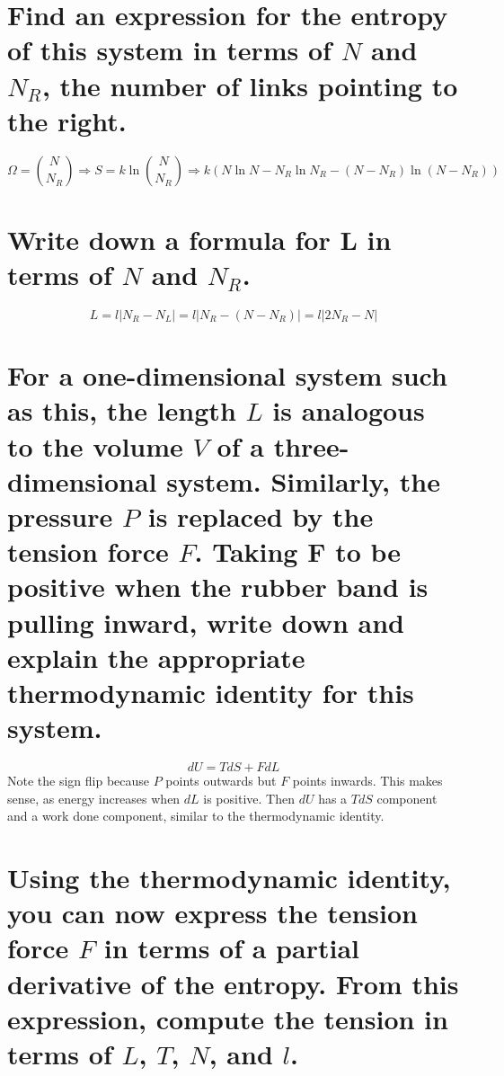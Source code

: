 \documentclass[answers]{exam}
\begin{document}
\begin{questions}
\begin{parts}
    \part{Find an expression for the entropy of this system in terms of $N$ and $N_R$, the number of links pointing to the right.}

    \begin{solution}
        $$\Omega = \binom{N}{N_R} \Rightarrow S = k\ln\binom{N}{N_R} \Rightarrow k(N\ln N - N_R\ln N_R - (N-N_R)\ln(N-N_R))$$
    \end{solution}

    \part{Write down a formula for L in terms of $N$ and $N_R$.}

    \begin{solution}
        $$L = l|N_R - N_L| = l|N_R - (N-N_R)| = l|2N_R - N|$$
    \end{solution}

    \part{For a one-dimensional system such as this, the length $L$ is analogous to the volume $V$ of a three-dimensional system. Similarly, the pressure $P$ is replaced by the tension force $F$. Taking F to be positive when the rubber band is pulling inward, write down and explain the appropriate thermodynamic identity for this system.}

    \begin{solution}
        $$dU = TdS + FdL$$
        Note the sign flip because $P$ points outwards but $F$ points inwards. This makes sense, as energy increases when $dL$ is positive. Then $dU$ has a $TdS$ component and a work done component, similar to the thermodynamic identity.
    \end{solution}

    \part{Using the thermodynamic identity, you can now express the tension force $F$ in terms of a partial derivative of the entropy. From this expression, compute the tension in terms of $L$, $T$, $N$, and $l$.}


\end{parts}
\end{questions}
\end{document}
